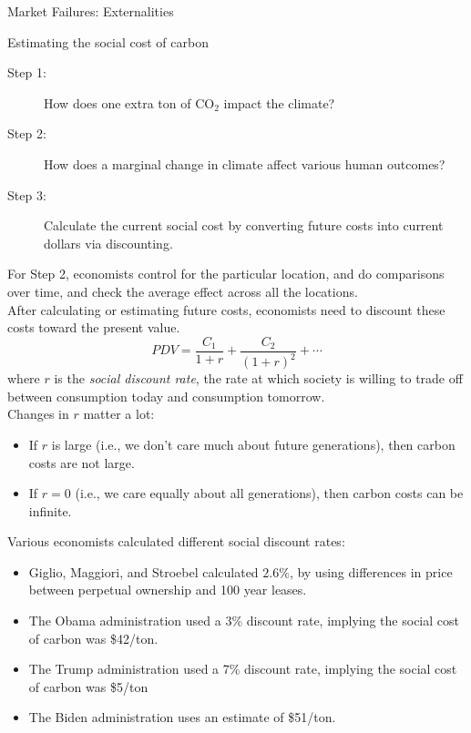 \documentclass[8pt]{extarticle}
\begin{document}
\begin{problem}{Market Failures: Externalities}
\begin{problem}{Estimating the social cost of carbon}
\begin{description}
        \item[Step 1:] How does one extra ton of CO$_2$ impact the climate?
        \item[Step 2:] How does a marginal change in climate affect various human outcomes?
        \item[Step 3:] Calculate the current social cost by converting future costs into current dollars via discounting.
      \end{description}
      For Step 2, economists control for the particular location, and do comparisons over time, and check the average effect across all the locations.\\

      After calculating or estimating future costs, economists need to discount these costs toward the present value.
      \[
        PDV = \frac{C_1}{1+r} + \frac{C_2}{(1+r)^2} + \cdots
      \] 
      where $r$ is the \textit{social discount rate}, the rate at which society is willing to trade off between consumption today and consumption tomorrow.\\

      Changes in $r$ matter a lot:
      \begin{itemize}
        \item If $r$ is large (i.e., we don't care much about future generations), then carbon costs are not large.
        \item If $r = 0$ (i.e., we care equally about all generations), then carbon costs can be infinite.
      \end{itemize}
      Various economists calculated different social discount rates:
      \begin{itemize}
        \item Giglio, Maggiori, and Stroebel calculated $2.6\%$, by using differences in price between perpetual ownership and 100 year leases.
        \item The Obama administration used a 3\% discount rate, implying the social cost of carbon was \$42/ton.
        \item The Trump administration used a 7\% discount rate, implying the social cost of carbon was \$5/ton
        \item The Biden administration uses an estimate of \$51/ton.
      \end{itemize}
    \end{problem}
  \end{problem}
\end{document}
